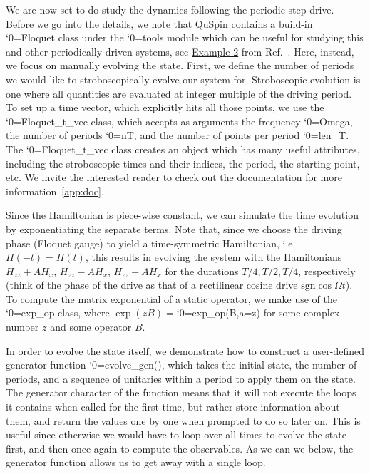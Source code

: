 \documentclass{SciPost}
\newcommand\0{\scalebox{-1}[1]{0}}
\let\svttfamily\ttfamily
\renewcommand\ttfamily{\svttfamily\catcode`0=\active }
\renewcommand\texttt{\bgroup\ttfamily\texttthelp}
\def\texttthelp#1{#1\egroup}
\newcommand{\Spincode}{example9.py}
\begin{document}
We are now set to do study the dynamics following the periodic step-drive. Before we go into the details, we note that QuSpin contains a build-in \texttt{Floquet} class under the \texttt{tools} module which can be useful for studying this and other periodically-driven systems, see \href{http://weinbe58.github.io/QuSpin/examples/example2.html}{Example 2} from Ref.~\cite{weinberg_17_quspin}. Here, instead, we focus on manually evolving the state. First, we define the number of periods we would like to stroboscopically evolve our system for. Stroboscopic evolution is one where all quantities are evaluated at integer multiple of the driving period. To set up a time vector, which explicitly hits all those points, we use the \texttt{Floquet\_t\_vec} class, which accepts as arguments the frequency \texttt{Omega}, the number of periods \texttt{nT}, and the number of points per period \texttt{len\_T}. The \texttt{Floquet\_t\_vec} class creates an object which has many useful attributes, including the stroboscopic times and their indices, the period, the starting point, etc. We invite the interested reader to check out the documentation for more information~\ref{app:doc}.

Since the Hamiltonian is piece-wise constant, we can simulate the time evolution by exponentiating the separate terms. Note that, since we choose the driving phase (Floquet gauge) to yield a time-symmetric Hamiltonian, i.e.~$H(-t)=H(t)$, this results in evolving the system with the Hamiltonians $H_{zz}+AH_x$, $H_{zz}-AH_x$, $H_{zz}+AH_x$ for the durations $T/4,T/2,T/4$, respectively (think of the phase of the drive as that of a rectilinear cosine drive $\mathrm{sgn}\cos\Omega t$). To compute the matrix exponential of a static operator, we make use of the \texttt{exp\_op} class, where $\exp(z B) = $\texttt{exp\_op(B,a=z)} for some complex number $z$ and some operator $B$.

In order to evolve the state itself, we demonstrate how to construct a user-defined generator function \texttt{evolve\_gen()}, which takes the initial state, the number of periods, and a sequence of unitaries within a period to apply them on the state. The generator character of the function means that it will not execute the loops it contains when called for the first time, but rather store information about them, and return the values one by one when prompted to do so later on. This is useful since otherwise we would have to loop over all times to evolve the state first, and then once again to compute the observables. As we can we below, the generator function allows us to get away with a single loop.
\end{document}
